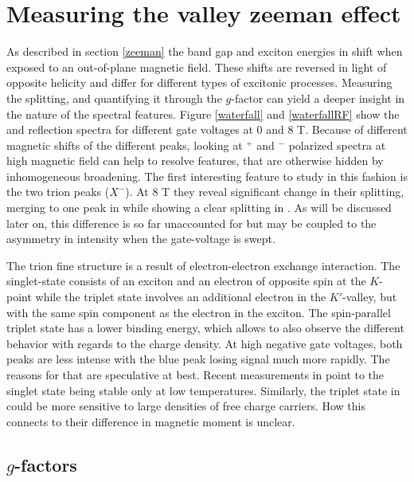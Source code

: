 \section{Measuring the valley zeeman effect}\label{zeemanspec}

As described in section \ref{zeeman} the band gap and exciton energies in \tmds shift when exposed to an out-of-plane magnetic field. These shifts are reversed in light of opposite helicity and differ for different types of excitonic processes. Measuring the splitting, and quantifying it through the $g$-factor can yield a deeper insight in the nature of the spectral features. Figure \ref{waterfall} and \ref{waterfallRF} show the \pl and reflection spectra for different gate voltages at 0 and 8 T. Because of different magnetic shifts of the different peaks, looking at \sigma$^+$ and \sigma$^-$ polarized spectra at high magnetic field can help to resolve features, that are otherwise hidden by inhomogeneous broadening. The first interesting feature to study in this fashion is the two trion peaks ($X^-$). At 8 T they reveal significant change in their splitting, merging to one peak in \sigp while showing a clear splitting in \sigm. As will be discussed later on, this difference is so far unaccounted for but may be coupled to the asymmetry in intensity when the gate-voltage is swept.

The trion fine structure is a result of electron-electron exchange interaction. The singlet-state consists of an exciton and an electron of opposite spin at the $K$-point while the triplet state involves an additional electron in the $K'$-valley, but with the same spin component as the electron in the exciton. The spin-parallel triplet state has a lower binding energy, which allows to also observe the different behavior with regards to the charge density. At high negative gate voltages, both peaks are less intense with the blue peak losing signal much more rapidly. The reasons for that are speculative at best. Recent measurements in \ws point to the singlet state being stable only at low temperatures\cite{vaclavkova_singlet_2018}. Similarly, the triplet state in \wse could be more sensitive to large densities of free charge carriers. How this connects to their difference in magnetic moment is unclear.

\subsection{\textup{$g$}-factors}


